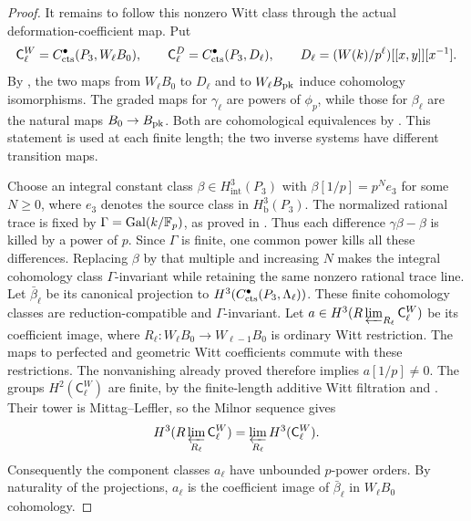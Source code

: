 \begin{proof}
It remains to follow this nonzero Witt class through the actual
deformation-coefficient map.  Put
\[
 \mathsf C^W_\ell=C^\bullet_{\mathrm{cts}}(P_3,W_\ell B_0),\qquad
 \mathsf C^D_\ell=C^\bullet_{\mathrm{cts}}(P_3,D_\ell),\qquad
 D_\ell=(W(k)/p^\ell)[[x,y]][x^{-1}].
\]
By , the two maps from $W_\ell B_0$
to $D_\ell$ and to $W_\ell B_{\mathrm{pk}}$ induce cohomology
isomorphisms.  The graded maps for $\gamma_\ell$ are powers of
$\phi_p$, while those for $\beta_\ell$ are the natural maps
$B_0\to B_{\mathrm{pk}}$.  Both are cohomological equivalences by
.  This statement is used at
each finite length; the two inverse systems have different
transition maps.

Choose an integral constant class
$\beta\in H^3_{\mathrm{int}}(P_3)$ with
$\beta[1/p]=p^N e_3$ for some $N\geq0$, where $e_3$ denotes the
source class in $H^3_{\mathrm b}(P_3)$.  The normalized rational
trace is fixed by $\Gamma=\operatorname{Gal}(k/\mathbb F_p)$, as proved in
.  Thus each difference
$\gamma\beta-\beta$ is killed by a power of $p$.  Since $\Gamma$
is finite, one common power kills all these differences.  Replacing
$\beta$ by that multiple and increasing $N$ makes the integral
cohomology class $\Gamma$-invariant while retaining the same nonzero
rational trace line.  Let $\bar\beta_\ell$ be its canonical projection
to $H^3(C^\bullet_{\mathrm{cts}}(P_3,\Lambda_\ell))$.  These finite
cohomology classes are reduction-compatible and $\Gamma$-invariant.
Let
$a\in H^3(R\varprojlim_{R_\ell}\mathsf C^W_\ell)$ be its coefficient image,
where $R_\ell:W_\ell B_0\to W_{\ell-1}B_0$ is ordinary Witt restriction.
The maps to perfected and geometric Witt coefficients commute with
these restrictions.  The nonvanishing already proved therefore implies
$a[1/p]\ne0$.  The groups $H^2(\mathsf C^W_\ell)$ are finite, by
the finite-length additive Witt filtration and
.
Their tower is Mittag--Leffler, so the Milnor sequence gives
\[
 H^3(R\varprojlim_{R_\ell}\mathsf C^W_\ell)
      =\varprojlim_{R_\ell} H^3(\mathsf C^W_\ell).
\]
Consequently the component classes $a_\ell$ have unbounded
$p$-power orders.  By naturality of the projections, $a_\ell$ is the
coefficient image of $\bar\beta_\ell$ in $W_\ell B_0$ cohomology.


\end{proof}
